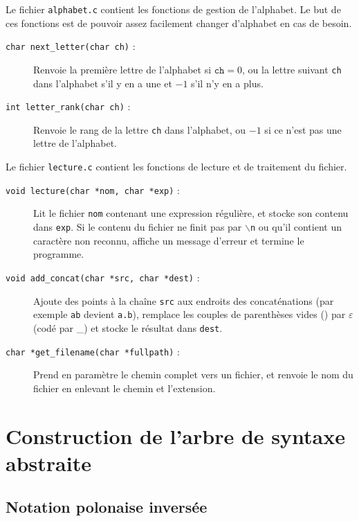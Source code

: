 \documentclass[12pt, a4paper]{article}
\begin{document}
Le fichier \texttt{alphabet.c} contient les fonctions de gestion de l'alphabet. Le but de ces fonctions est de pouvoir assez facilement changer d'alphabet en cas de besoin.
\begin{description}
\item[\texttt{char next\_letter(char ch)} :] Renvoie la première lettre de l'alphabet si $\texttt{ch} = 0$, ou la lettre suivant \texttt{ch} dans l'alphabet s'il y en a une et $-1$ s'il n'y en a plus.
\item[\texttt{int letter\_rank(char ch)} :] Renvoie le rang de la lettre \texttt{ch} dans l'alphabet, ou $-1$ si ce n'est pas une lettre de l'alphabet.
\end{description}

Le fichier \texttt{lecture.c} contient les fonctions de lecture et de traitement du fichier.
\begin{description}
\item[\texttt{void lecture(char *nom, char *exp)} :] Lit le fichier \texttt{nom} contenant une expression régulière, et stocke son contenu dans \texttt{exp}. Si le contenu du fichier ne finit pas par \texttt{$\backslash$n} ou qu'il contient un caractère non reconnu, affiche un message d'erreur et termine le programme.
\item[\texttt{void add\_concat(char *src, char *dest)} :] Ajoute des points à la chaîne \texttt{src} aux endroits des concaténations (par exemple \texttt{ab} devient \texttt{a.b}), remplace les couples de parenthèses vides () par $\varepsilon$ (codé par \_) et stocke le résultat dans \texttt{dest}.
\item[\texttt{char *get\_filename(char *fullpath)} :] Prend en paramètre le chemin complet vers un fichier, et renvoie le nom du fichier en enlevant le chemin et l'extension.
\end{description}

\section{Construction de l'arbre de syntaxe abstraite}

\subsection{Notation polonaise inversée}
\end{document}
